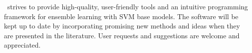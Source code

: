 \esvm\ strives to provide high-quality,
user-friendly tools and an intuitive programming framework for ensemble learning with SVM base models. The software will be kept up to date by incorporating promising new methods and ideas when they are presented in the literature. User requests and suggestions are welcome and appreciated.



\cleardoublepage

